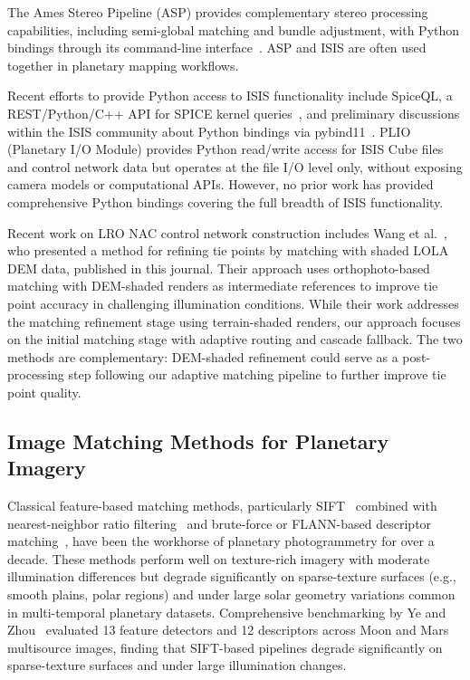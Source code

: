 \documentclass[lettersize,journal]{IEEEtran}
\begin{document}
The Ames Stereo Pipeline (ASP) provides complementary stereo processing capabilities, including semi-global matching and bundle adjustment, with Python bindings through its command-line interface~\cite{mcmichael2024asp}. ASP and ISIS are often used together in planetary mapping workflows.

Recent efforts to provide Python access to ISIS functionality include SpiceQL, a REST/Python/C++ API for SPICE kernel queries~\cite{usgs2024spiceql}, and preliminary discussions within the ISIS community about Python bindings via pybind11~\cite{pyisis2026discussion}. PLIO (Planetary I/O Module) provides Python read/write access for ISIS Cube files and control network data but operates at the file I/O level only, without exposing camera models or computational APIs. However, no prior work has provided comprehensive Python bindings covering the full breadth of ISIS functionality.

Recent work on LRO NAC control network construction includes Wang et al.~\cite{wang2025controlnet}, who presented a method for refining tie points by matching with shaded LOLA DEM data, published in this journal. Their approach uses orthophoto-based matching with DEM-shaded renders as intermediate references to improve tie point accuracy in challenging illumination conditions. While their work addresses the matching refinement stage using terrain-shaded renders, our approach focuses on the initial matching stage with adaptive routing and cascade fallback. The two methods are complementary: DEM-shaded refinement could serve as a post-processing step following our adaptive matching pipeline to further improve tie point quality.

\subsection{Image Matching Methods for Planetary Imagery}

Classical feature-based matching methods, particularly SIFT~\cite{lowe2004sift} combined with nearest-neighbor ratio filtering~\cite{lowe1999ratio} and brute-force or FLANN-based descriptor matching~\cite{muja2009flann}, have been the workhorse of planetary photogrammetry for over a decade. These methods perform well on texture-rich imagery with moderate illumination differences but degrade significantly on sparse-texture surfaces (e.g., smooth plains, polar regions) and under large solar geometry variations common in multi-temporal planetary datasets. Comprehensive benchmarking by Ye and Zhou~\cite{ye2024planetary} evaluated 13 feature detectors and 12 descriptors across Moon and Mars multisource images, finding that SIFT-based pipelines degrade significantly on sparse-texture surfaces and under large illumination changes.
\end{document}
